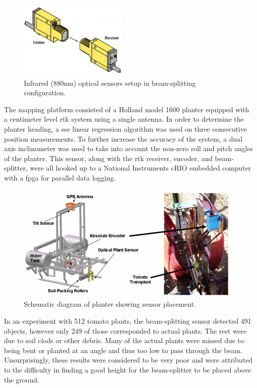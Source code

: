 \begin{figure}
	\centering
    \includegraphics[height=1.5in]{figures/tomator_optical_sensor.jpg}
    \caption[Infrared beam-splitter]{Infrared (880nm) optical sensors setup in beam-splitting configuration.}
    \label{figure:optical_sensor}
\end{figure}

The mapping platform consisted of a Holland model 1600 planter equipped with a centimeter level \ac{rtk} system using a single antenna.  In order to determine the planter heading, a \ac{sse} linear regression algorithm was used on three consecutive position measurements. To further increase the accuracy of the system, a dual axis inclinometer was used to take into account the non-zero roll and pitch angles of the planter.  This sensor, along with the \ac{rtk} receiver, encoder, and beam-splitter, were all hooked up to a National Instruments cRIO embedded computer with a \ac{fpga} for parallel data logging.    

\begin{figure}
	\centering
    \includegraphics[width=6in]{figures/tomator_planter.jpg}
    \caption[Tomato mapping platform]{Schematic diagram of planter showing sensor placement.}
    \label{figure:tomato_planter}
\end{figure}

In an experiment with 512 tomato plants, the beam-splitting sensor detected 491 objects, however only 249 of those corresponded to actual plants.  The rest were due to soil clods or other debris.  Many of the actual plants were missed due to being bent or planted at an angle and thus too low to pass through the beam.  Unsurprisingly, these results were considered to be very poor and were attributed to the difficulty in finding a good height for the beam-splitter to be placed above the ground.

